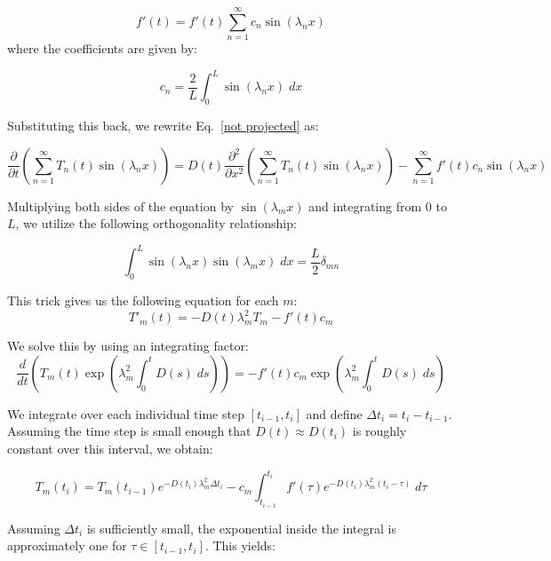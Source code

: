 \documentclass{article}
\begin{document}
\begin{equation}
    f'(t) = f'(t)\sum_{n=1}^\infty c_n \sin(\lambda_n x)
\end{equation}
where the coefficients are given by:

\begin{equation}
    c_n = \frac{2}{L}\int_0^L \sin(\lambda_n x)\;dx
\end{equation}

Substituting this back, we rewrite Eq.~\ref{not projected} as:

\begin{equation}
    \frac{\partial}{\partial t}\left(\sum_{n=1}^\infty T_n(t)\sin(\lambda_n x)\right) = D(t)\frac{\partial^2}{\partial x^2}\left(\sum_{n=1}^\infty T_n(t)\sin(\lambda_nx)\right) - \sum_{n=1}^\infty f'(t)c_n \sin(\lambda_n x)
\end{equation}

Multiplying both sides of the equation by $\sin(\lambda_m x)$ and integrating from $0$ to $L$, we utilize the following orthogonality relationship:

\begin{equation}
    \int_0^L\sin(\lambda_n x)\sin(\lambda_m x)\; dx= \frac{L}{2}\delta_{mn}
\end{equation}

This trick gives us the following equation for each $m$:
\begin{equation}
    T'_m(t) = -D(t)\lambda_m^2T_m - f'(t)c_m
\end{equation}

We solve this by using an integrating factor:
\begin{equation}
    \frac{d}{dt}\left( T_m(t)\exp\left(\lambda_m^2\int_0^t D(s)\; ds\right)\right) = -f'(t)c_m\exp\left(\lambda_m^2\int_0^t D(s)\; ds\right)
\end{equation}

We integrate over each individual time step $[t_{i-1},t_i]$ and define $\Delta t_i = t_i - t_{i-1}$. Assuming the time step is small enough that $D(t) \approx D(t_i)$ is roughly constant over this interval, we obtain:

\begin{equation}
    T_m(t_i) = T_m(t_{i-1})e^{-D(t_i)\lambda_m^2\Delta t_i} - c_m\int_{t_{i-1}}^{t_i}f'(\tau)e^{-D(t_i)\lambda_m^2(t_i-\tau)}\; d\tau
\end{equation}

Assuming $\Delta t_i$ is sufficiently small, the exponential inside the integral is approximately one for $\tau\in [t_{i-1},t_i]$. This yields:
\end{document}

